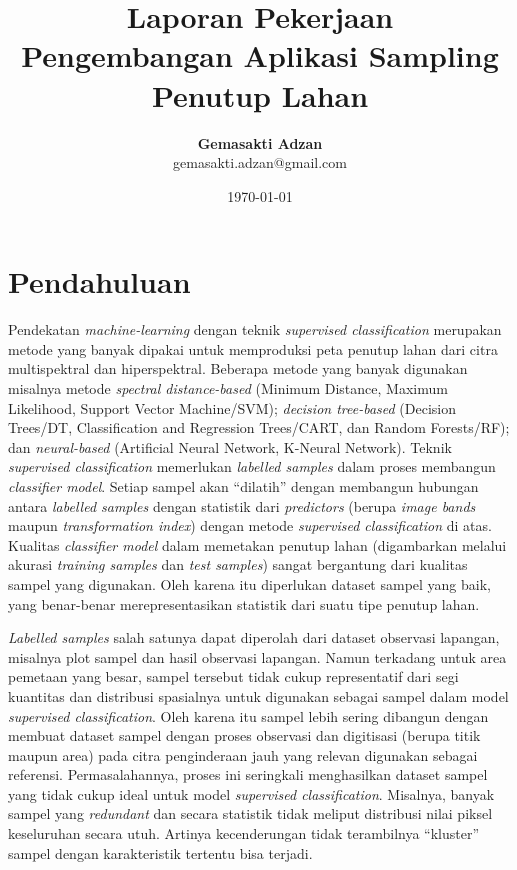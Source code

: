 \documentclass[a4paper,12pt]{article}
\begin{document}
\title{Laporan Pekerjaan \\ Pengembangan Aplikasi Sampling Penutup Lahan}
\author{\textbf{Gemasakti Adzan} \\ gemasakti.adzan@gmail.com}
\date{\today}
\maketitle

\section{Pendahuluan}
Pendekatan \textit{machine-learning} dengan teknik \textit{supervised classification} merupakan metode yang banyak dipakai untuk memproduksi peta penutup lahan dari citra multispektral dan hiperspektral. Beberapa metode yang banyak digunakan misalnya metode \textit{spectral distance-based} (Minimum Distance, Maximum Likelihood, Support Vector Machine/SVM); \textit{decision tree-based} (Decision Trees/DT, Classification and Regression Trees/CART, dan Random Forests/RF); dan \textit{neural-based} (Artificial Neural Network, K-Neural Network). Teknik \textit{supervised classification} memerlukan \textit{labelled samples} dalam proses membangun \textit{classifier model}. Setiap sampel akan “dilatih” dengan membangun hubungan antara \textit{labelled samples} dengan statistik dari \textit{predictors} (berupa \textit{image bands} maupun \textit{transformation index}) dengan metode \textit{supervised classification} di atas. Kualitas \textit{classifier model} dalam memetakan penutup lahan (digambarkan melalui akurasi \textit{training samples} dan \textit{test samples}) sangat bergantung dari kualitas sampel yang digunakan. Oleh karena itu diperlukan dataset sampel yang baik, yang benar-benar merepresentasikan statistik dari suatu tipe penutup lahan. \par

\textit{Labelled samples} salah satunya dapat diperolah dari dataset observasi lapangan, misalnya plot sampel dan hasil observasi lapangan. Namun terkadang untuk area pemetaan yang besar, sampel tersebut tidak cukup representatif dari segi kuantitas dan distribusi spasialnya untuk digunakan sebagai sampel dalam model \textit{supervised classification}. Oleh karena itu sampel lebih sering dibangun dengan membuat dataset sampel dengan proses observasi dan digitisasi (berupa titik maupun area) pada citra penginderaan jauh yang relevan digunakan sebagai referensi. Permasalahannya, proses ini seringkali menghasilkan dataset sampel yang tidak cukup ideal untuk model \textit{supervised classification}. Misalnya, banyak sampel yang \textit{redundant} dan secara statistik tidak meliput distribusi nilai piksel keseluruhan secara utuh. Artinya kecenderungan tidak terambilnya “kluster” sampel dengan karakteristik tertentu bisa terjadi. \par
\end{document}
